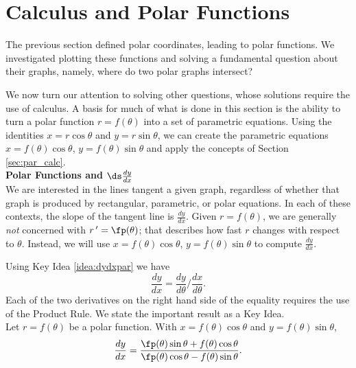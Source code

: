 \section{Calculus and Polar Functions} \label{sec:polarcalc}
The previous section defined polar coordinates, leading to polar functions. We investigated plotting these functions and solving a fundamental question about their graphs, namely, where do two polar graphs intersect?

We now turn our attention to solving other questions, whose solutions require the use of calculus. A basis for much of what is done in this section is the ability to turn a polar function $r=f(\theta)$ into a set of parametric equations. Using the identities $x=r\cos \theta$ and $y=r\sin \theta$, we can create the parametric equations $x=f(\theta)\cos\theta$, $y=f(\theta)\sin\theta$ and apply the concepts of Section \ref{sec:par_calc}.\\

\noindent\textbf{\large Polar Functions and $\ds \frac{dy}{dx}$}\\

We are interested in the lines tangent a given graph, regardless of whether that graph is produced by rectangular, parametric, or polar equations. In each of these contexts, the slope of the tangent line is $\frac{dy}{dx}$. Given $r=f(\theta)$, we are generally \textit{not} concerned with $r\,'=\fp(\theta)$; that describes how fast $r$ changes with respect to $\theta$. Instead, we will use $x=f(\theta)\cos\theta$, $y=f(\theta)\sin\theta$ to compute $\frac{dy}{dx}$. 

Using Key Idea \ref{idea:dydxpar} we have $$\frac{dy}{dx} = \frac{dy}{d\theta}\Big/\frac{dx}{d\theta}.$$ Each of the two derivatives on the right hand side of the equality requires the use of the Product Rule. We state the important result as a Key Idea.\\

{Let $r=f(\theta)$ be a polar function. With $x=f(\theta)\cos\theta$ and $y=f(\theta)\sin\theta$,
$$\frac{dy}{dx} = \frac{\fp(\theta)\sin\theta+f(\theta)\cos\theta}{\fp(\theta)\cos\theta-f(\theta)\sin\theta}.$$
}


